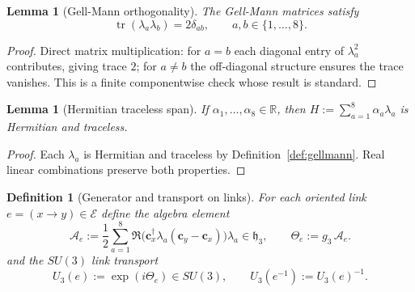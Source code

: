 \documentclass[11pt]{article}
\newtheorem{definition}[theorem]{Definition}
\newtheorem{lemma}[theorem]{Lemma}
\theoremstyle{remark}
\newcommand{\R}{\mathbb R}
\newcommand{\mcE}{\mathcal E}
\newcommand{\tr}{\operatorname{tr}}
\newcommand{\mathfrakh}{\mathfrak h_3}
\begin{document}
\begin{lemma}[Gell-Mann orthogonality]
\label{lem:gellmann}
The Gell-Mann matrices satisfy
\[
\tr(\lambda_a\lambda_b)=2\delta_{ab},\qquad a,b\in\{1,\dots,8\}.
\]
\end{lemma}
\begin{proof}
Direct matrix multiplication: for $a=b$ each diagonal entry of $\lambda_a^2$
contributes, giving trace $2$; for $a\ne b$ the off-diagonal structure ensures
the trace vanishes.
This is a finite componentwise check whose result is standard.
\end{proof}

\begin{lemma}[Hermitian traceless span]
\label{lem:hermitian-span}
If $\alpha_1,\dots,\alpha_8\in\R$, then $H:=\sum_{a=1}^8\alpha_a\lambda_a$
is Hermitian and traceless.
\end{lemma}
\begin{proof}
Each $\lambda_a$ is Hermitian and traceless by Definition~\ref{def:gellmann}.
Real linear combinations preserve both properties.
\end{proof}

\begin{definition}[Generator and transport on links]
\label{def:transport}
For each oriented link $e=(x\to y)\in\mcE$ define the algebra element
\[
\mathcal A_e:=\frac12\sum_{a=1}^8
\Re\!\bigl(\mathbf c_x^\dagger\lambda_a(\mathbf c_y-\mathbf c_x)\bigr)\lambda_a
\in\mathfrakh,
\qquad
\Theta_e:=g_3\,\mathcal A_e.
\]
and the $SU(3)$ link transport
\[
U_3(e):=\exp(i\Theta_e)\in SU(3),
\qquad U_3(e^{-1}):=U_3(e)^{-1}.
\]
\end{definition}
\end{document}
